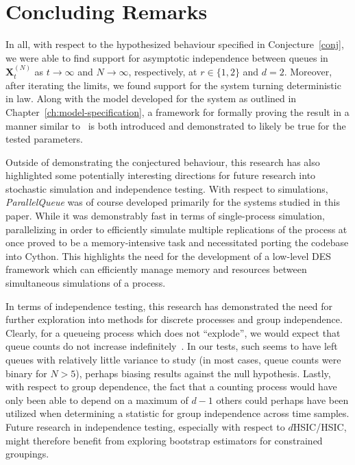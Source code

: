 
\chapter{Concluding Remarks}\label{ch:discussion}

In all, with respect to the hypothesized behaviour specified in Conjecture~\ref{conj}, we were able to find support for asymptotic independence between queues in
$\mathbf{X}^{(N)}_{t}$ as $t\rightarrow \infty$ and $N\rightarrow \infty$, respectively, at $r \in \{1,2\}$ and $d = 2$.
Moreover, after iterating the limits, we found support for the system turning deterministic in law.
Along with the model developed for the system as outlined in Chapter~\ref{ch:model-specification}, a framework for formally proving the result in a manner similar to~\cite{bramson_asymptotic_2012}
is both introduced and demonstrated to likely be true for the tested parameters.

Outside of demonstrating the conjectured behaviour, this research has also highlighted some potentially interesting directions
for future research into stochastic simulation and independence testing. 
With respect to simulations, \textit{ParallelQueue} was of course developed primarily for the systems studied in this paper.
While it was demonstrably fast in terms of single-process simulation, parallelizing in order to efficiently simulate multiple replications of the process
at once proved to be a memory-intensive task and necessitated porting the codebase into Cython.
This highlights the need for the development of a low-level DES framework which can efficiently manage memory and resources between simultaneous simulations of a process.

In terms of independence testing, this research has demonstrated the need for further exploration into methods for discrete processes and group independence.
Clearly, for a queueing process which does not ``explode'', we would expect that queue counts do not increase indefinitely~\cite{gardner_redundancy-d_2017}.
In our tests, such seems to have left queues with relatively little variance to study (in most cases, queue counts were binary for $N>5$), perhaps biasing results against the null hypothesis.
Lastly, with respect to group dependence, the fact that a counting process would have only been able to depend on a maximum of $d-1$ others could perhaps have been utilized when determining a statistic for group independence
across time samples.
Future research in independence testing, especially with respect to $d$HSIC/HSIC, might therefore benefit from exploring bootstrap estimators for constrained groupings.

